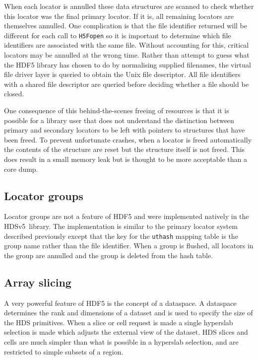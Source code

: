 \documentclass[final,authoryear,5p,times,twocolumn]{elsarticle}
\newcommand{\new}{HDSv5}
\begin{document}
When each locator is annulled these data structures are scanned to
check whether this locator was the final primary locator. If it is,
all remaining locators are themselves annulled. One complication is
that the file identifier returned will be different for each call to
\texttt{H5Fopen} so it is important to determine which file
identifiers are associated with the same file. Without accounting for
this, critical locators may be annulled at the wrong time. Rather than
attempt to guess what the HDF5 library has chosen to do by normalising
supplied filenames, the virtual file driver layer is queried to obtain
the Unix file descriptor. All file identifiers with a shared file
descriptor are queried before deciding whether a file should be
closed.

One consequence of this behind-the-scenes freeing of resources is that
it is possible for a library user that does not understand the
distinction between primary and secondary locators to be left with
pointers to structures that have been freed. To prevent unfortunate
crashes, when a locator is freed automatically the contents of the
structure are reset but the structure itself is not freed. This does
result in a small memory leak but is thought to be more acceptable
than a core dump.

\subsection{Locator groups}

Locator groups are not a feature of HDF5 and were implemented natively
in the \new\ library. The implementation is similar to the primary
locator system described previously except that the key for the
\texttt{uthash} mapping table is the group name rather than the file
identifier. When a group is flushed, all locators in the group are
annulled and the group is deleted from the hash table.

\subsection{Array slicing}

A very powerful feature of HDF5 is the concept of a dataspace. A
dataspace determines the rank and dimensions of a dataset and is used
to specify the size of the HDS primitives. When a slice or cell request is
made a single hyperslab selection is made which adjusts the external
view of the dataset. HDS slices and cells are much simpler than what
is possible in a hyperslab selection, and are restricted to simple
subsets of a region.
\end{document}
